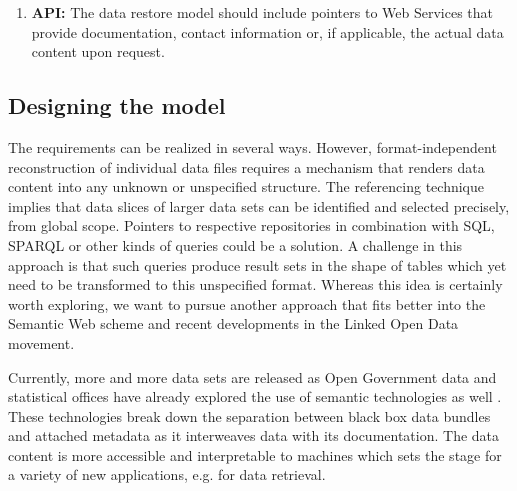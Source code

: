 \documentclass{acm_proc_article-sp}
\begin{document}
\begin{enumerate}

  \item \textbf{API:} The data restore model should include pointers to Web Services that provide documentation, contact information or, if applicable, the actual data content upon request.

\end{enumerate}

\subsection{Designing the model}


The requirements can be realized in several ways.
However, format-independent reconstruction of individual data files requires a mechanism that renders data content into any unknown or unspecified structure.
The referencing technique implies that data slices of larger data sets can be identified and selected precisely, from global scope.
Pointers to respective repositories in combination with SQL, SPARQL or other kinds of queries could be a solution.
A challenge in this approach is that such queries produce result sets in the shape of tables which yet need to be transformed to this unspecified format.
Whereas this idea is certainly worth exploring, we want to pursue another approach that fits better into the Semantic Web scheme and recent developments in the Linked Open Data movement.


Currently, more and more data sets are released as Open Government data and statistical offices have already explored the use of semantic technologies as well \cite{Halb_LDOW08}.
These technologies break down the separation between black box data bundles and attached metadata as it interweaves data with its documentation.
The data content is more accessible and interpretable to machines which sets the stage for a variety of new applications, e.g. for data retrieval. \cite{BahlsTochtermann_2012}
\end{document}

